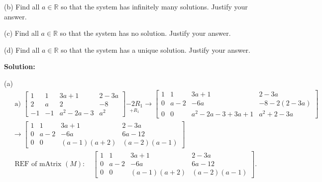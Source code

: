 \documentclass{article}
\begin{document}
\begin{enumerate}
(b) Find all $a \in \mathbb{R}$ so that the system has infinitely many solutions. Justify your answer.

(c) Find all $a \in \mathbb{R}$ so that the system has no solution. Justify your answer.

(d)  Find all $a \in \mathbb{R}$ so that the system has a unique solution. Justify your answer.

\textbf{Solution:}

(a) \begin{equation}
\begin{aligned}
& \text { a) }\left[\begin{array}{ccc|c}
1 & 1 & 3 a+1 & 2-3 a \\
2 & a & 2 & -8 \\
-1 & -1 & a^2-2 a-3 & a^2
\end{array}\right]\underset{+R_1}{-2 R_1} \rightarrow\left[\begin{array}{ccc|c}
1 & 1 & 3 a+1 & 2-3 a \\
0 & a-2 & -6 a & -8-2(2-3 a) \\
0 & 0 & a^2-2 a-3+3 a+1 & a^2+2-3 a
\end{array}\right] \\
& \rightarrow\left[\begin{array}{ccc|c}
1 & 1 & 3 a+1 & 2-3 a \\
0 & a-2 & -6 a & 6 a-12 \\
0 & 0 & (a-1)(a+2) & (a-2)(a-1)
\end{array}\right] \\
& \text { REF of mAtrix }(M): \quad\left[\begin{array}{ccc|c}
1 & 1 & 3 a+1 & 2-3 a \\
0 & a-2 & -6 a & 6 a-12 \\
0 & 0 & (a-1)(a+2) & (a-2)(a-1)
\end{array}\right] \text {. } \\
&
\end{aligned}
\end{equation}


\end{enumerate}
\end{document}
